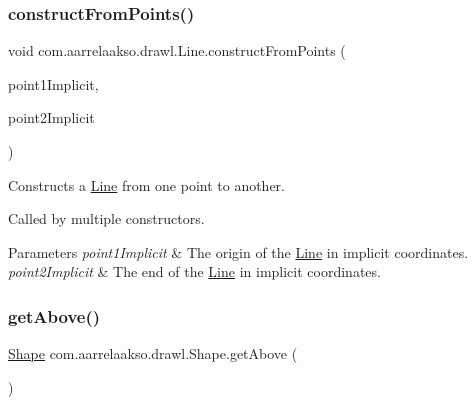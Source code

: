 \subsubsection{\texorpdfstring{construct\+From\+Points()}{constructFromPoints()}}
{\footnotesize\ttfamily void com.\+aarrelaakso.\+drawl.\+Line.\+construct\+From\+Points (\begin{DoxyParamCaption}\item[{@Not\+Null \hyperlink{classcom_1_1aarrelaakso_1_1drawl_1_1_point}{Point}}]{point1\+Implicit,  }\item[{@Not\+Null \hyperlink{classcom_1_1aarrelaakso_1_1drawl_1_1_point}{Point}}]{point2\+Implicit }\end{DoxyParamCaption})\hspace{0.3cm}{\ttfamily [private]}}



Constructs a \hyperlink{classcom_1_1aarrelaakso_1_1drawl_1_1_line}{Line} from one point to another. 

Called by multiple constructors.


\begin{DoxyParams}{Parameters}
{\em point1\+Implicit} & The origin of the \hyperlink{classcom_1_1aarrelaakso_1_1drawl_1_1_line}{Line} in implicit coordinates. \\
\hline
{\em point2\+Implicit} & The end of the \hyperlink{classcom_1_1aarrelaakso_1_1drawl_1_1_line}{Line} in implicit coordinates. \\
\hline
\end{DoxyParams}
\mbox{\label{classcom_1_1aarrelaakso_1_1drawl_1_1_shape_acebea2aa57031322323c9bf50ee447db}} 
\subsubsection{\texorpdfstring{get\+Above()}{getAbove()}}
{\footnotesize\ttfamily \hyperlink{classcom_1_1aarrelaakso_1_1drawl_1_1_shape}{Shape} com.\+aarrelaakso.\+drawl.\+Shape.\+get\+Above (\begin{DoxyParamCaption}{ }\end{DoxyParamCaption})\hspace{0.3cm}{\ttfamily [inherited]}}



